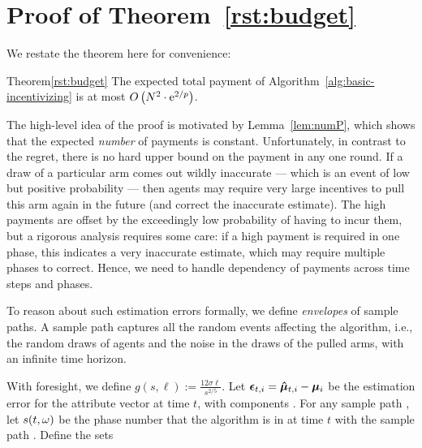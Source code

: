 \section{Proof of Theorem~\ref{rst:budget}}
\label{sec:payment-proof}

We restate the theorem here for convenience:

\begin{rtheorem}{Theorem}{\ref{rst:budget}}
The expected total payment of
Algorithm~\ref{alg:basic-incentivizing} is at most
$O \left(N^2 \cdot \mathrm{e}^{2/p} \right)$.
\end{rtheorem}

The high-level idea of the proof is motivated by Lemma~\ref{lem:numP},
which shows that the expected \emph{number} of payments is constant.
Unfortunately, in contrast to the regret, there is no hard upper bound
on the payment in any one round.
If a draw of a particular arm comes out wildly inaccurate --- which is
an event of low but positive probability ---
then agents may require very large incentives to pull this arm again
in the future (and correct the inaccurate estimate).
The high payments are offset by the exceedingly low probability of
having to incur them, but a rigorous analysis requires some care:
if a high payment is required in one phase, this indicates a very
inaccurate estimate, which may require multiple phases to correct.
Hence, we need to handle dependency of payments across time steps and
phases.

To reason about such estimation errors formally, we define
\emph{envelopes} of sample paths.
A sample path \SP captures all the random events affecting the
algorithm, i.e., the random draws  of agents and the
noise \NoiseV[t] in the draws of the pulled arms,
with an infinite time horizon.

With foresight, we define $g(s, \ell) := \frac{12 \sigma \ell}{s^{2/5}}$.
Let $\bm{\epsilon}_{t,i} = \bm{\hat{\mu}}_{t,i} - \bm{\mu}_{i}$ be the estimation
error for the attribute vector  at time $t$,
with components .
For any sample path \SP, let $s (t,\omega)$ be the phase number that the
algorithm is in at time $t$ with the sample path \SP.
Define the sets

